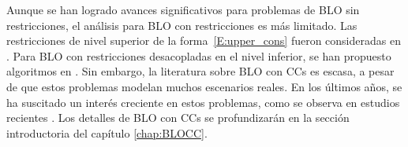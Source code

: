 
 

Aunque se han logrado avances significativos para problemas de BLO sin restricciones, el análisis para BLO con restricciones es más limitado. Las restricciones de nivel superior de la forma~\eqref{E:upper_cons} fueron consideradas en \cite{chen2022single,hong2020ac,chen2022fast}. Para BLO con restricciones desacopladas en el nivel inferior, se han propuesto algoritmos en \cite{khanduri2023linearly,kwon2023penalty,shen2023penaltybased}. 
%
Sin embargo, la literatura sobre BLO con CCs es escasa, a pesar de que estos problemas modelan muchos escenarios reales. En los últimos años, se ha suscitado un interés creciente en estos problemas, como se observa en estudios recientes \cite{liu2023value,xiao2022alternating,yao2024constrained,yao2024overcoming}. Los detalles de BLO con CCs se profundizarán en la sección introductoria del capítulo \ref{chap:BLOCC}.

